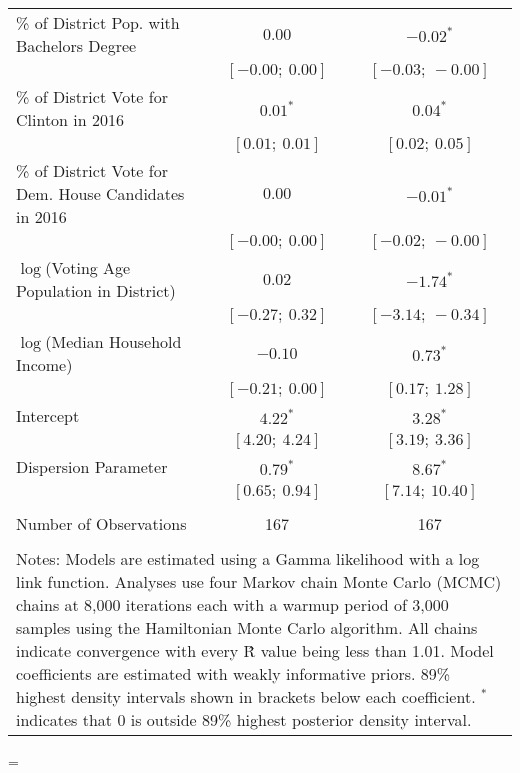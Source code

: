 \begin{table}[!htb]
\begin{center}
{{\begin{tabular}{@{\extracolsep{5pt}}l c c }
\quad \% of District Pop. with Bachelors Degree   & $0.00$            & $-0.02^{*}$       \\
          & $[-0.00;\ 0.00]$  & $[-0.03;\ -0.00]$ \\
\quad \% of District Vote for Clinton in 2016  & $0.01^{*}$        & $0.04^{*}$        \\
          & $[0.01;\ 0.01]$   & $[0.02;\ 0.05]$   \\
\quad \% of District Vote for Dem. House Candidates in 2016  & $0.00$            & $-0.01^{*}$       \\
          & $[-0.00;\ 0.00]$  & $[-0.02;\ -0.00]$ \\
\quad $\log$(Voting Age Population in District)   & $0.02$            & $-1.74^{*}$       \\
          & $[-0.27;\ 0.32]$  & $[-3.14;\ -0.34]$ \\
\quad $\log$(Median Household Income)    & $-0.10$           & $0.73^{*}$        \\
          & $[-0.21;\ 0.00]$  & $[0.17;\ 1.28]$   \\
\quad Intercept         & $4.22^{*}$        & $3.28^{*}$        \\
          & $[4.20;\ 4.24]$   & $[3.19;\ 3.36]$   \\
Dispersion Parameter     & $0.79^{*}$        & $8.67^{*}$        \\
          & $[0.65;\ 0.94]$   & $[7.14;\ 10.40]$  \\
\midrule  \\[-1.8ex]
Number of Observations & 167 & 167 \\
\bottomrule  \\[-1.8ex]
\multicolumn{3}{p{\linewidth}}{Notes: Models are estimated using a Gamma likelihood with a log link function. Analyses use four Markov chain Monte Carlo (MCMC) chains at 8,000 iterations each with a warmup period of 3,000 samples using the Hamiltonian Monte Carlo algorithm. All chains indicate convergence with every \^{R} value being less than 1.01. Model coefficients are estimated with weakly informative priors. 89\% highest density intervals shown in brackets below each coefficient. $^*$ indicates that 0 is outside 89\% highest posterior density interval.}
\end{tabular}}
=\hbox{\contents}
	\setlength{\linewidth}{\wd0-2\tabcolsep-.25em}
	\contents
}
\end{center}
\end{table}
